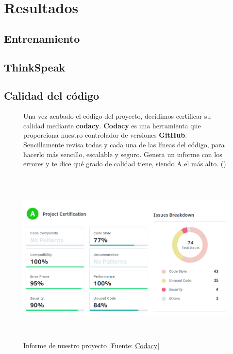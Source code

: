 \cleardoublepage

\chapter{Resultados}
\label{makereference6}

\section{Entrenamiento}
\label{makereference6.1}

\section{ThinkSpeak}
\label{makereference6.2}

\section{Calidad del código}
\label{makereference6.3}

\begin{figure}[htb]
	Una vez acabado el código del proyecto, decidimos certificar su calidad mediante \textbf{codacy}.
	\textbf{Codacy} es una herramienta que proporciona nuestro controlador de versiones \textbf{GitHub}. Sencillamente revisa todas y cada una de las líneas del código, para hacerlo más sencillo, escalable y seguro. Genera un informe con los errores y te dice qué grado de calidad tiene, siendo A el más alto. (\cite{ARP:Codacy:2017})
	
	\begin{center}
		\includegraphics[height=3.5in]{figures/codacy.png}
		\caption{Informe de nuestro proyecto [Fuente: \href{https://www.codacy.com}{Codacy}]}
	\end{center}
	
	\label{codacy}
\end{figure}